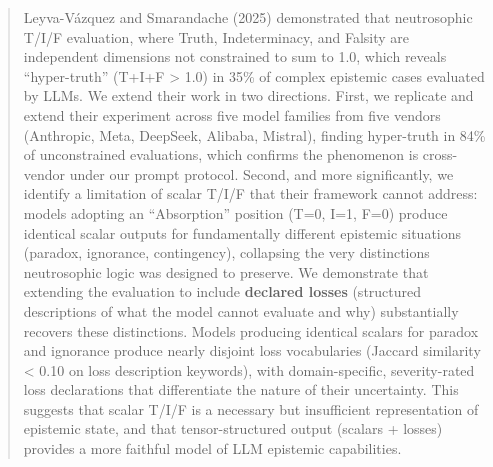 \begin{abstract}

Leyva-Vázquez and Smarandache (2025) demonstrated that neutrosophic
T/I/F evaluation, where Truth, Indeterminacy, and Falsity are
independent dimensions not constrained to sum to 1.0, which reveals
``hyper-truth'' (T+I+F > 1.0) in 35\% of complex epistemic
cases evaluated by LLMs. We extend their work in two directions. First,
we replicate and extend their experiment across five model families from
five vendors (Anthropic, Meta, DeepSeek, Alibaba, Mistral), finding
hyper-truth in 84\% of unconstrained evaluations, which confirms the
phenomenon is cross-vendor under our prompt protocol. Second, and
more significantly, we identify a limitation of scalar T/I/F that their
framework cannot address: models adopting an ``Absorption'' position
(T=0, I=1, F=0) produce identical scalar outputs for fundamentally
different epistemic situations (paradox, ignorance, contingency),
collapsing the very distinctions neutrosophic logic was designed to
preserve. We demonstrate that extending the evaluation to include
\textbf{declared losses} (structured descriptions of what the model
cannot evaluate and why) substantially recovers these distinctions. Models
producing identical scalars for paradox and ignorance produce nearly
disjoint loss vocabularies (Jaccard similarity < 0.10 on loss
description keywords), with domain-specific, severity-rated loss
declarations that differentiate the nature of their uncertainty. This
suggests that scalar T/I/F is a necessary but insufficient
representation of epistemic state, and that tensor-structured output
(scalars + losses) provides a more faithful model of LLM epistemic
capabilities.

\end{abstract}
